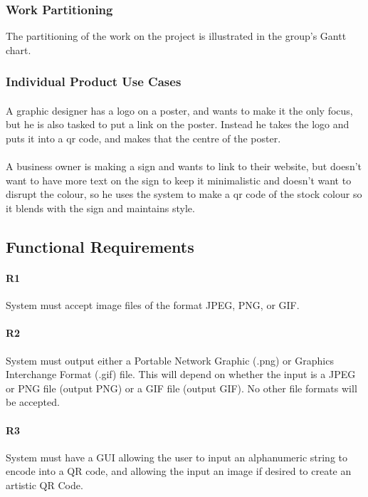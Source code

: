 \documentclass[12pt, titlepage]{article}
\begin{document}
\subsubsection{Work Partitioning}

	The partitioning of the work on the project is illustrated in the group's 
	Gantt chart.

\subsubsection{Individual Product Use Cases}

	\paragraph{}
	A graphic designer has a logo on a poster, and wants to make it the only 
	focus, but he is also tasked to put a link on the poster. Instead he takes 
	the logo and puts it into a qr code, and makes that the centre of the 
	poster.
	\paragraph{}
	 A business owner is making a sign and wants to link to their website, but 
	 doesn't want to have more text on the sign to keep it minimalistic and 
	 doesn't want to disrupt the colour, so he uses the system to make a qr 
	 code of the stock colour so it blends with the sign and maintains style.
	

\subsection{Functional Requirements}

	\paragraph{R1}
	System must accept image files of the format JPEG, PNG, or GIF.
	\paragraph{R2}
	System must output either a Portable Network Graphic (.png) or Graphics 
	Interchange Format (.gif) file. This will depend on whether the input is a 
	JPEG or PNG file (output PNG) or a GIF file (output GIF). No other file 
	formats will be accepted. 
	\paragraph{R3}
	System must have a GUI allowing the user to input an alphanumeric string to 
	encode into a QR code, and allowing the input an image %
	 if desired to create 
	an artistic QR Code.
\end{document}
